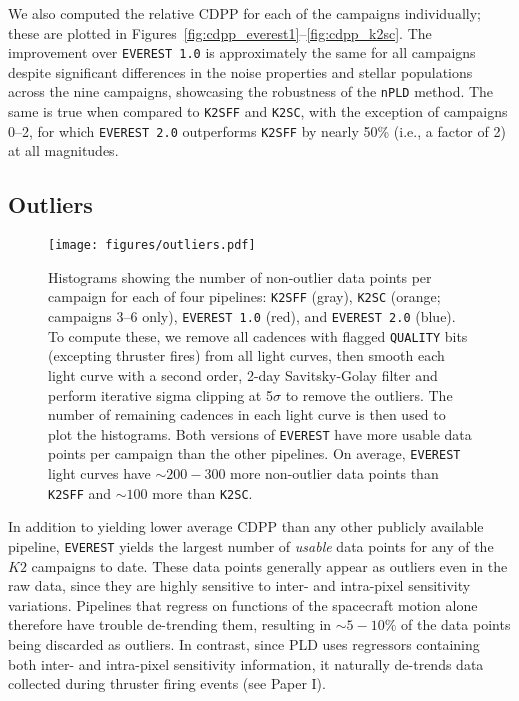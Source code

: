 \documentclass[]{emulateapj}
\begin{document}
We also computed the relative CDPP for each of the campaigns individually; these are
plotted in Figures~\ref{fig:cdpp_everest1}--\ref{fig:cdpp_k2sc}. The improvement
over \texttt{EVEREST 1.0} is approximately the same for all campaigns despite significant
differences in the noise properties and stellar populations across the nine campaigns,
showcasing the robustness of the \texttt{nPLD} method.
The same is true when compared to \texttt{K2SFF} and \texttt{K2SC}, with the exception of
campaigns 0--2, for which \texttt{EVEREST 2.0} outperforms \texttt{K2SFF} by nearly 50\%
(i.e., a factor of 2) at all magnitudes.

\subsection{Outliers}

\begin{figure}[hbt]
  \begin{center}
      \texttt{[image: figures/outliers.pdf]}
       \caption{Histograms showing the number of non-outlier data points per campaign for each
        of four pipelines: \texttt{K2SFF} (gray), \texttt{K2SC} (orange; campaigns 3--6 only),
        \texttt{EVEREST 1.0} (red), and \texttt{EVEREST 2.0} (blue). To compute these, we remove all cadences
        with flagged \texttt{QUALITY} bits (excepting thruster fires) from all light curves, then
        smooth each light curve with a second order, 2-day Savitsky-Golay filter and perform iterative
        sigma clipping at 5$\sigma$ to remove the outliers. The number of remaining cadences in
        each light curve is then used to plot the histograms. Both versions of \texttt{EVEREST}
        have more usable data points per campaign than the other pipelines. On average,
        \texttt{EVEREST} light curves have ${\sim}200-300$ more non-outlier data points than \texttt{K2SFF}
        and ${\sim}100$ more than \texttt{K2SC}.}
     \label{fig:outliers}
  \end{center}
\end{figure}

In addition to yielding lower average CDPP than any other publicly available pipeline,
\texttt{EVEREST} yields the largest number of \emph{usable} data points for any of the
$K2$ campaigns to date. These data points generally appear as outliers even in the
raw data, since they are highly sensitive to inter- and intra-pixel sensitivity variations.
Pipelines that regress on functions of the spacecraft motion alone therefore have trouble
de-trending them, resulting in ${\sim}5-10\%$ of the data points being discarded as outliers.
In contrast, since PLD uses regressors containing both inter- and intra-pixel sensitivity
information, it naturally de-trends data collected during thruster firing events (see Paper I).
\end{document}
